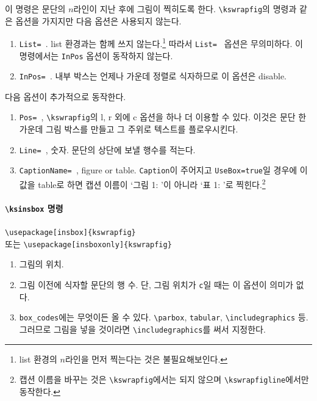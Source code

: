 \documentclass[a4paper,nanum]{oblivoir}
\begin{document}
\begin{boxedverbatim}
\end{boxedverbatim}

이 명령은 문단의 $n$라인이 지난 후에 그림이 찍히도록 한다. \verb|\kswrapfig|의 명령과 같은 옵션을 가지지만
다음 옵션은 사용되지 않는다.
\begin{enumerate}\tightlist
\item \verb|List= |. list 환경과는 함께 쓰지 않는다.\footnote{list 환경의 $n$라인을 먼저 찍는다는 것은 불필요해보인다.}
따라서 \verb|List= | 옵션은 무의미하다. 이 명령에서는 \verb|InPos| 옵션이 동작하지 않는다.
\item \verb|InPos= |. 내부 박스는 언제나 가운데 정렬로 식자하므로 이 옵션은 disable.
\end{enumerate}
다음 옵션이 추가적으로 동작한다.
\begin{enumerate}\tightlist
\item \verb|Pos= |, \verb|\kswrapfig|의 l, r 외에 c 옵션을 하나 더 이용할 수 있다. 이것은 문단 한가운데 그림 박스를 만들고 그 주위로 텍스트를 플로우시킨다.
\item \verb|Line= |, 숫자. 문단의 상단에 보낼 행수를 적는다.
\item \verb|CaptionName= |, figure or table. \verb|Caption|이 주어지고 \verb|UseBox=true|일 경우에 이 값을 table로 하면 캡션 이름이 `그림 1: '이 아니라 `표 1: '로 찍힌다.\footnote{캡션 이름을 바꾸는 것은 \texttt{\textbackslash kswrapfig}에서는 되지 않으며 \texttt{\textbackslash kswrapfigline}에서만 동작한다.}
\end{enumerate}

\paragraph{\texttt{\textbackslash ksinsbox} 명령}

\verb|\usepackage[insbox]{kswrapfig}| \\
또는 \verb|\usepackage[insboxonly]{kswrapfig}|

\begin{boxedverbatim}
\end{boxedverbatim}
\begin{enumerate}
\item 그림의 위치.
\item 그림 이전에 식자할 문단의 행 수. 단, 그림 위치가 \verb|c|일 때는 이 옵션이 의미가 없다.
\item \verb|box_codes|에는 무엇이든 올 수 있다. \verb|\parbox|, \verb|tabular|, \verb|\includegraphics| 등. 그러므로 그림을 넣을 것이라면 \verb|\includegraphics|를 써서 지정한다.
\end{enumerate}
\end{document}
